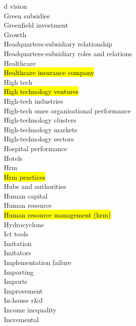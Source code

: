 \documentclass[a4paper]{article}
\begin{document}
\begin{multicols*}{2}
\begin{footnotesize}
d vision \\ Green subsidies \\ Greenfield investment \\ Growth \\ Headquarters-subsidiary relationship \\ Headquarters-subsidiary roles and relations \\ Healthcare \\ \hl{Healthcare insurance company} \\ High tech \\ \hl{High technology ventures} \\ High-tech industries \\ High-tech smes organisational performance \\ High-technology clusters \\ High-technology markets \\ High-technology sectors \\ Hospital performance \\ Hotels \\ Hrm \\ \hl{Hrm practices} \\ Hubs and authorities \\ Human capital \\ Human resource \\ \hl{Human resource management (hrm)} \\ Hydrocyclone \\ Ict tools \\ Imitation \\ Imitators \\ Implementation failure \\ Importing \\ Imports \\ Improvement \\ In-house r\&d \\ Income inequality \\ Incremental 
\end{footnotesize}
\end{multicols*}
\end{document}
